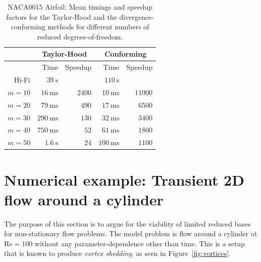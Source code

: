 \documentclass[a4paper]{jpconf}
\begin{document}
\begin{table}
  \begin{center}
    \bgroup{}
    \begin{tabular}{rrrrr}
      & \multicolumn{2}{c}{\bf Taylor-Hood} & \multicolumn{2}{c}{\bf Conforming} \\
      \hline
      & Time & Speedup & Time & Speedup \\
      \hline
      Hi-Fi & $\SI{39}{\second}$ & & $\SI{110}{\second}$ & \\
      $m=10$ & $\SI{16}{\milli\second}$ & $2400$ & $\SI{10}{\milli\second}$ & $11000$ \\
      $m=20$ & $\SI{79}{\milli\second}$ & $490$ & $\SI{17}{\milli\second}$ & $6500$ \\
      $m=30$ & $\SI{290}{\milli\second}$ & $130$ & $\SI{32}{\milli\second}$ & $3400$ \\
      $m=40$ & $\SI{750}{\milli\second}$ & $52$ & $\SI{61}{\milli\second}$ & $1800$ \\
      $m=50$ & $\SI{1.6}{\second}$ & $24$ & $\SI{100}{\milli\second}$ & $1100$ \\
      \hline
    \end{tabular}
    \egroup
  \end{center}
  \caption{
    NACA0015 Airfoil: Mean timings and speedup factors for the
    Taylor-Hood and the divergence-conforming methods for different
    numbers of reduced degrees-of-freedom.
  }
  \label{tbl:airfoil}
\end{table}

\section{Numerical example: Transient 2D flow around a cylinder}

The purpose of this section is to argue for the viability of limited
reduced bases for non-stationary flow problems.  The model problem is
flow around a cylinder at $\text{Re} = 100$ without any
parameter-dependence other than time. This is a setup that is known to
produce \emph{vortex shedding}, as seen in Figure~\ref{fig:vortices}.
\end{document}
